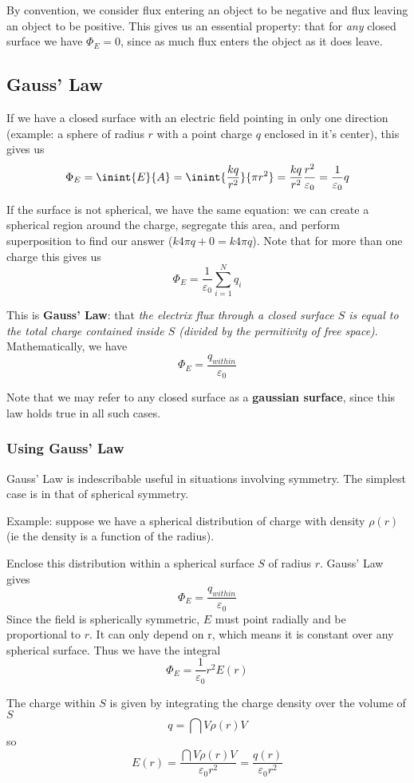 \documentclass[12pt]{article}
\begin{document}
By convention, we consider flux entering an object to be negative and flux leaving an object to be positive. This gives us an essential property: that for \emph{any} closed surface we have $\Phi_E = 0$, since as much flux enters the object as it does leave.

\subsection*{Gauss' Law}
If we have a closed surface with an electric field pointing in only one direction (example: a sphere of radius $r$ with a point charge $q$ enclosed in it's center), this gives us \[ \Phi_E = \inint{E}{A} = \inint{\frac{kq}{r^2}}{\pi r^2} = \frac{kq}{r^2} \frac{r^2}{\varepsilon_0} = \frac{1}{\varepsilon_0} q \]

If the surface is not spherical, we have the same equation: we can create a spherical region around the charge, segregate this area, and perform superposition to find our answer ($k 4\pi q + 0 = k 4\pi q$). Note that for more than one charge this gives us \[ \Phi_E = \frac{1}{\varepsilon_0} \sum_{i = 1}^N q_i \]

This is {\bf Gauss' Law}: that \emph{the electrix flux through a closed surface $S$ is equal to the total charge contained inside $S$ (divided by the permitivity of free space)}. Mathematically, we have \[ \Phi_E = \frac{q_{within}}{\varepsilon_0} \]

Note that we may refer to any closed surface as a {\bf gaussian surface}, since this law holds true in all such cases.

\subsubsection*{Using Gauss' Law}
Gauss' Law is indescribable useful in situations involving symmetry. The simplest case is in that of spherical symmetry.

Example: suppose we have a spherical distribution of charge with density $\rho(r)$ (ie the density is a function of the radius).

Enclose this distribution within a spherical surface $S$ of radius $r$. Gauss' Law gives \[ \Phi_E = \frac{q_{within}}{\varepsilon_0} \] Since the field is spherically symmetric, $E$ must point radially and be proportional to $r$. It can only depend on r, which means it is constant over any spherical surface. Thus we have the integral \[ \Phi_E = \frac{1}{\varepsilon_0} r^2 E(r) \]

The charge within $S$ is given by integrating the charge density over the volume of $S$ \[ q = \dint{V}{}{\rho(r)}{V} \] so \[ E(r) = \frac{\dint{V}{}{\rho(r)}{V}}{\varepsilon_0 r^2} = \frac{q(r)}{\varepsilon_0 r^2} \]
\end{document}
